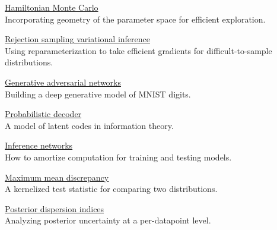 
\href{#}{Hamiltonian Monte Carlo} \\
Incorporating geometry of the parameter space for efficient exploration.

\href{#}{Rejection sampling variational inference} \\
Using reparameterization to take efficient gradients for
difficult-to-sample distributions.

\href{gan}{Generative adversarial networks} \\
Building a deep generative model of MNIST digits.

\href{#}{Probabilistic decoder} \\
A model of latent codes in information theory.

\href{#}{Inference networks} \\
How to amortize computation for training and testing models.

\href{#}{Maximum mean discrepancy} \\
A kernelized test statistic for comparing two distributions.

\href{#}{Posterior dispersion indices} \\
Analyzing posterior uncertainty at a per-datapoint level.



